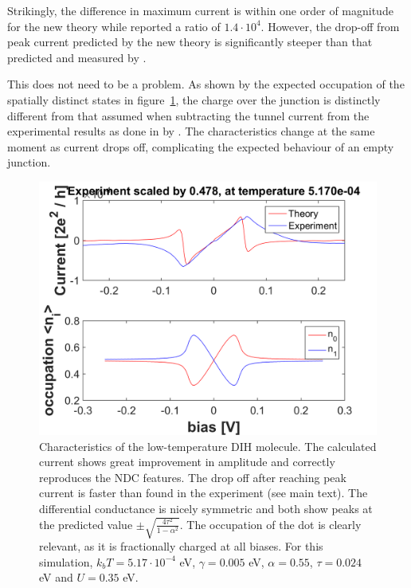\documentclass{article}
\begin{document}
\begin{multicols}{2}
        Strikingly, the difference in maximum current is within one order of magnitude for the new theory while \citet{perrinnano} reported a ratio of $1.4\cdot10^{4}$. However, the drop-off from peak current predicted by the new theory is significantly steeper than that predicted and measured by \citet{perrinnano}.
         
        This does not need to be a problem. As shown by the expected occupation of the spatially distinct states in figure~\ref{fig:perrinmolecule}, the charge over the junction is distinctly different from that assumed when subtracting the tunnel current from the experimental results as done in by \cite{perrinnano}. The characteristics change at the same moment as current drops off, complicating the expected behaviour of an empty junction. 
        
    \begin{figure}[b]
        \centering
        \includegraphics[width=\textwidth]{figBigFont/perrin.png}
        \caption{\label{fig:perrinmolecule} Characteristics of the low-temperature DIH molecule. The calculated current shows great improvement in amplitude and correctly reproduces the NDC features. The drop off after reaching peak current  is faster than found in the experiment (see main text). The differential conductance is nicely symmetric and both show peaks at the predicted value $\pm\sqrt{\frac{4\tau^2}{1-\alpha^2}}$. The occupation of the dot is clearly relevant, as it is fractionally charged at all biases. For this simulation, $k_b T=5.17\cdot 10^{-4}$ eV, $\gamma=0.005$ eV, $\alpha=0.55$, $\tau=0.024$ eV and $U=0.35$ eV.}
    \end{figure}
    

\end{multicols}
\end{document}

